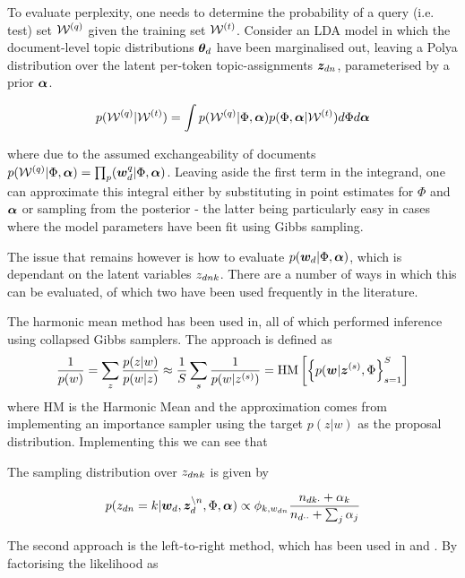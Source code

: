 To evaluate perplexity, one needs to determine the probability of a query (i.e. test) set $\mathcal{W}^{(q)}$ given the training set $\mathcal{W}^{(t)}$. Consider an LDA model in which the document-level topic distributions ${ \bm \theta_d }$ have been marginalised out, leaving a Polya distribution over the latent per-token topic-assignments ${ \bm z_{dn} }$, parameterised by a prior $\bm \alpha$.

\begin{align}
p(\mathcal{W}^{(q)}|\mathcal{W}^{(t)}) = \int p(\mathcal{W}^{(q)}|\Phi, \bm \alpha)p(\Phi,\bm \alpha | \mathcal{W}^{(t)}) d\Phi d\bm \alpha
\end{align}

where due to the assumed exchangeability of documents $p(\mathcal{W}^{(q)}|\Phi, \bm \alpha) = \prod_ p(\bm w_d^{q}|\Phi, \bm \alpha)$. Leaving aside the first term in the integrand, one can approximate this integral either by substituting in point estimates for $\Phi$ and $\bm \alpha$ or sampling from the posterior - the latter being particularly easy in cases where the model parameters have been fit using Gibbs sampling.

The issue that remains however is how to evaluate $p(\bm w_d|\Phi, \bm \alpha)$, which is dependant on the latent variables ${ z_{dnk} }$. There are a number of ways in which this can be evaluated, of which two have been used frequently in the literature.

The harmonic mean method has been used in\cite{Griffiths2004}\cite{Griffiths2005}\cite{Wallach2006}, all of which performed inference using collapsed Gibbs samplers. The approach is defined as
\begin{align}
\frac{1}{ {p(w)} } = \sum_z \frac{p(z|w)}{p(w|z)} \approx \frac{1}{ {S} } \sum_s \frac{1}{ {p(w|{ z }^{(s)})} }
=  \text{HM}\left[ \left\{ p(\bm w|{ \bm z }^{(s)}, \Phi \right\}_{s=1}^{S}  \right]
\end{align}
where HM is the Harmonic Mean and the approximation comes from implementing an importance sampler using the target $p(z|w)$ as the proposal distribution. Implementing this we can see that 

The sampling distribution over ${ z_{dnk} }$ is given by

\begin{align}
p(z_{dn} = k | \bm w_d, \bm z_d^{\setminus n}, \Phi, \bm \alpha) \propto \phi_{k,{w_{dn}}}\frac{n_{dk\cdot} + \alpha_k}{n_{d\cdot\cdot} + \sum_j \alpha_j}
\end{align}

The second approach is the left-to-right method, which has been used in \cite{Mimno2011} and \cite{Mimno2012a}. By factorising the likelihood as

